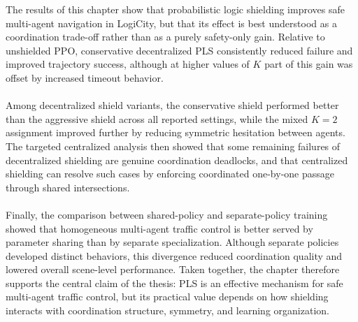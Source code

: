 The results of this chapter show that probabilistic logic shielding improves safe multi-agent navigation in LogiCity, but that its effect is best understood as a coordination trade-off rather than as a purely safety-only gain. Relative to unshielded PPO, conservative decentralized PLS consistently reduced failure and improved trajectory success, although at higher values of \(K\) part of this gain was offset by increased timeout behavior.
\\
\\
Among decentralized shield variants, the conservative shield performed better than the aggressive shield across all reported settings, while the mixed \(K=2\) assignment improved further by reducing symmetric hesitation between agents. The targeted centralized analysis then showed that some remaining failures of decentralized shielding are genuine coordination deadlocks, and that centralized shielding can resolve such cases by enforcing coordinated one-by-one passage through shared intersections.
\\
\\
Finally, the comparison between shared-policy and separate-policy training showed that homogeneous multi-agent traffic control is better served by parameter sharing than by separate specialization. Although separate policies developed distinct behaviors, this divergence reduced coordination quality and lowered overall scene-level performance. Taken together, the chapter therefore supports the central claim of the thesis: PLS is an effective mechanism for safe multi-agent traffic control, but its practical value depends on how shielding interacts with coordination structure, symmetry, and learning organization.
